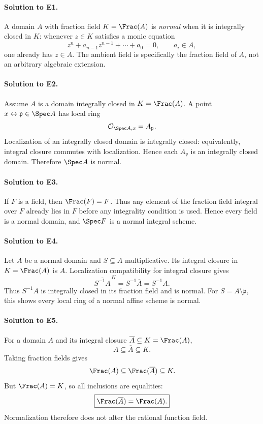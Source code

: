 
\paragraph{Solution to E1.}
A domain \(A\) with fraction field \(K=\Frac(A)\) is \emph{normal} when it is integrally closed in
\(K\): whenever \(z\in K\) satisfies a monic equation
\[
z^n+a_{n-1}z^{n-1}+\cdots+a_0=0,\qquad a_i\in A,
\]
one already has \(z\in A\).  The ambient field is specifically the fraction field of \(A\), not an
arbitrary algebraic extension.

\paragraph{Solution to E2.}
Assume \(A\) is a domain integrally closed in \(K=\Frac(A)\).  A point
\(x\leftrightarrow\mathfrak p\in\Spec A\) has local ring
\[
\mathcal O_{\Spec A,x}=A_{\mathfrak p}.
\]
Localization of an integrally closed domain is integrally closed: equivalently, integral closure
commutes with localization.  Hence each \(A_{\mathfrak p}\) is an integrally closed domain.
Therefore \(\Spec A\) is normal.

\paragraph{Solution to E3.}
If \(F\) is a field, then \(\Frac(F)=F\).  Thus any element of the fraction field integral over
\(F\) already lies in \(F\) before any integrality condition is used.  Hence every field is a
normal domain, and \(\Spec F\) is a normal integral scheme.

\paragraph{Solution to E4.}
Let \(A\) be a normal domain and \(S\subseteq A\) multiplicative.  Its integral closure in
\(K=\Frac(A)\) is \(A\).  Localization compatibility for integral closure gives
\[
\overline{S^{-1}A}^{\,K}=S^{-1}\overline A=S^{-1}A.
\]
Thus \(S^{-1}A\) is integrally closed in its fraction field and is normal.  For
\(S=A\setminus\mathfrak p\), this shows every local ring of a normal affine scheme is normal.

\paragraph{Solution to E5.}
For a domain \(A\) and its integral closure \(\overline A\subseteq K=\Frac(A)\),
\[
A\subseteq\overline A\subseteq K.
\]
Taking fraction fields gives
\[
\Frac(A)\subseteq\Frac(\overline A)\subseteq K.
\]
But \(\Frac(A)=K\), so all inclusions are equalities:
\[
\boxed{\Frac(\overline A)=\Frac(A).}
\]
Normalization therefore does not alter the rational function field.

